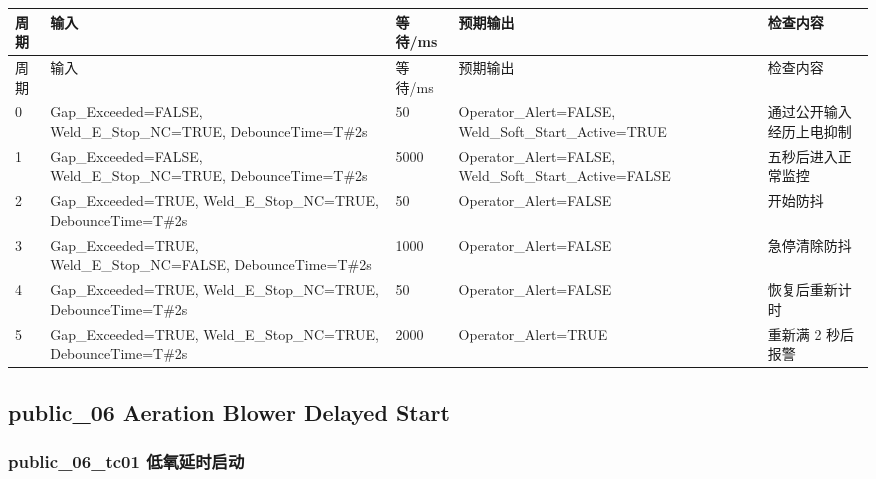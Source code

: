 \begin{longtable}{L{1.0cm}L{4.7cm}L{1.4cm}L{4.0cm}L{2.1cm}}

\toprule

周期 & 输入 & 等待/ms & 预期输出 & 检查内容\\

\midrule

\endfirsthead

\toprule

周期 & 输入 & 等待/ms & 预期输出 & 检查内容\\

\midrule

\endhead

0 & Gap\_Exceeded=FALSE, Weld\_E\_Stop\_NC=TRUE, DebounceTime=T\#2s & 50 & Operator\_Alert=FALSE, Weld\_Soft\_Start\_Active=TRUE & 通过公开输入经历上电抑制\\

1 & Gap\_Exceeded=FALSE, Weld\_E\_Stop\_NC=TRUE, DebounceTime=T\#2s & 5000 & Operator\_Alert=FALSE, Weld\_Soft\_Start\_Active=FALSE & 五秒后进入正常监控\\

2 & Gap\_Exceeded=TRUE, Weld\_E\_Stop\_NC=TRUE, DebounceTime=T\#2s & 50 & Operator\_Alert=FALSE & 开始防抖\\

3 & Gap\_Exceeded=TRUE, Weld\_E\_Stop\_NC=FALSE, DebounceTime=T\#2s & 1000 & Operator\_Alert=FALSE & 急停清除防抖\\

4 & Gap\_Exceeded=TRUE, Weld\_E\_Stop\_NC=TRUE, DebounceTime=T\#2s & 50 & Operator\_Alert=FALSE & 恢复后重新计时\\

5 & Gap\_Exceeded=TRUE, Weld\_E\_Stop\_NC=TRUE, DebounceTime=T\#2s & 2000 & Operator\_Alert=TRUE & 重新满 2 秒后报警\\

\bottomrule

\end{longtable}

\subsection{{\ttfamily public\_06} Aeration Blower Delayed Start}

\subsubsection{{\ttfamily public\_06\_tc01} 低氧延时启动}

